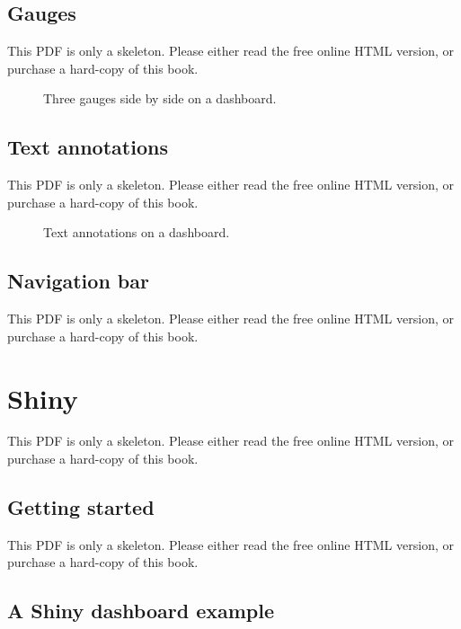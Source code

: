 \documentclass[
  11pt,
]{krantz}
\theoremstyle{definition}
\theoremstyle{definition}
\theoremstyle{definition}
\theoremstyle{definition}
\theoremstyle{remark}
\begin{document}
\subsection{Gauges}\label{gauges}

This PDF is only a skeleton. Please either read the free online HTML version, or purchase a hard-copy of this book.

\begin{figure}\caption{Three gauges side by side on a dashboard.}\end{figure}

\subsection{Text annotations}\label{text-annotations}

This PDF is only a skeleton. Please either read the free online HTML version, or purchase a hard-copy of this book.

\begin{figure}\caption{Text annotations on a dashboard.}\end{figure}

\subsection{Navigation bar}\label{navigation-bar}

This PDF is only a skeleton. Please either read the free online HTML version, or purchase a hard-copy of this book.

\section{Shiny}\label{shiny}

This PDF is only a skeleton. Please either read the free online HTML version, or purchase a hard-copy of this book.

\subsection{Getting started}\label{getting-started}

This PDF is only a skeleton. Please either read the free online HTML version, or purchase a hard-copy of this book.

\subsection{A Shiny dashboard example}\label{a-shiny-dashboard-example}
\end{document}
